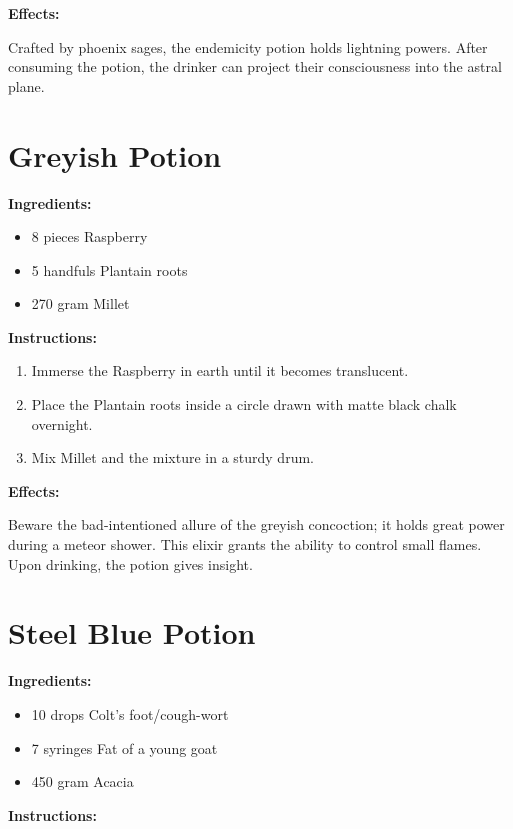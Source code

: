 \documentclass{article}
\begin{document}
\textbf{Effects:}

Crafted by phoenix sages, the endemicity potion holds lightning powers. After consuming the potion, the drinker can project their consciousness into the astral plane.

\newpage
\section*{Greyish Potion}

\textbf{Ingredients:}

\begin{itemize}
  \item 8 pieces Raspberry
  \item 5 handfuls Plantain roots
  \item 270 gram Millet
\end{itemize}

\textbf{Instructions:}

\begin{enumerate}
  \item Immerse the Raspberry in earth until it becomes translucent.
  \item Place the Plantain roots inside a circle drawn with matte black chalk overnight.
  \item Mix Millet and the mixture in a sturdy drum.
\end{enumerate}

\textbf{Effects:}

Beware the bad-intentioned allure of the greyish concoction; it holds great power during a meteor shower. This elixir grants the ability to control small flames. Upon drinking, the potion gives insight.

\newpage
\section*{Steel Blue Potion}

\textbf{Ingredients:}

\begin{itemize}
  \item 10 drops Colt's foot/cough-wort
  \item 7 syringes Fat of a young goat
  \item 450 gram Acacia
\end{itemize}

\textbf{Instructions:}
\end{document}
